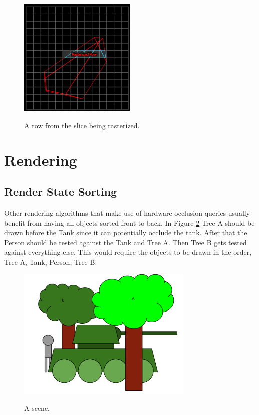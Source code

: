 \documentclass[12pt]{ucthesis}
\newcommand{\captionfonts}{\small\bf\ssp}
\begin{document}
\begin{figure}
\begin{center}
\includegraphics[width=0.5\textwidth]{Images/RasterizingAlgorithm/Final/FrustSliceNRowOrthoLabeled.png}
\captionfonts
\caption[A Frustum Slice And Row]{A row from the slice being rasterized.}
\label{fig:scene-frust-row}
\end{center}
\end{figure}

\section{Rendering}
\label{rendering}

\subsection{Render State Sorting}
\label {render-state-sorting}
Other rendering algorithms that make use of hardware occlusion queries usually benefit from having all objects sorted front to back.
In Figure \ref{fig:a-scene} Tree A should be drawn before the Tank since it can potentially occlude the tank.
After that the Person should be tested against the Tank and Tree A.
Then Tree B gets tested against everything else.
This would require the objects to be drawn in the order, Tree A, Tank, Person, Tree B.

\begin{figure}
\begin{center}
\includegraphics[width=0.75\textwidth]{Images/sample-scene.pdf}
\captionfonts
\caption[A scene]{A scene.}
\label{fig:a-scene}
\end{center}
\end{figure}
\end{document}
